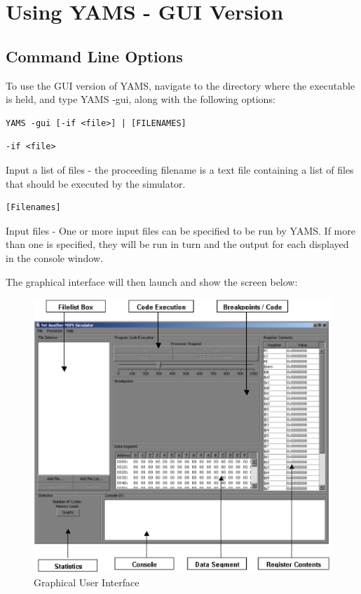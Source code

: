 
\section{Using YAMS - GUI Version}

\subsection{Command Line Options}
To use the GUI version of YAMS, navigate to the directory where the executable is held, and type  YAMS -gui, along with the following options:

\begin{verbatim}
YAMS -gui [-if <file>] | [FILENAMES]
\end{verbatim}

\begin{verbatim}
-if <file>
\end{verbatim}
Input a list of files - the proceeding filename	is a text file containing a list of files that should be executed by the simulator.

\begin{verbatim}
[Filenames]
\end{verbatim}
Input files - One or more input files can be specified to be run by YAMS.  If more than one is specified, they will be run in turn and the output for each displayed in the console window.



The graphical interface will then launch and show the screen below:

\begin{figure}[h]
\centering
\includegraphics[scale=0.5]{Ch4-Fig2.eps}
\caption{Graphical User Interface}
\label{figure.GUI}
\end{figure}



